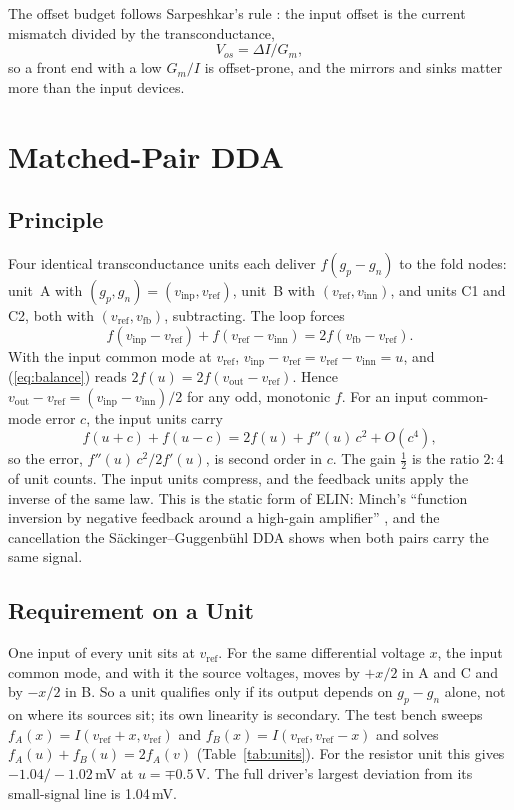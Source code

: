 \documentclass[journal]{IEEEtran}
\newcommand{\mV}{\,mV}
\newcommand{\vinp}{v_\mathrm{inp}}
\newcommand{\vinn}{v_\mathrm{inn}}
\newcommand{\vref}{v_\mathrm{ref}}
\newcommand{\vfb}{v_\mathrm{fb}}
\newcommand{\vout}{v_\mathrm{out}}
\begin{document}
The offset budget follows Sarpeshkar's rule \cite[\S3.3.4]{sarpeshkar97}: the input offset
is the current mismatch divided by the transconductance,
\begin{equation}
V_{os} = \Delta I / G_m ,
\end{equation}
so a front end with a low $G_m/I$ is offset-prone, and the mirrors and sinks matter more than
the input devices.

\section{Matched-Pair DDA}

\subsection{Principle}
Four identical transconductance units each deliver $f(g_p-g_n)$ to the fold nodes:
unit~A with $(g_p,g_n)=(\vinp,\vref)$, unit~B with $(\vref,\vinn)$, and units C1 and C2,
both with $(\vref,\vfb)$, subtracting. The loop forces
\begin{equation}
f(\vinp-\vref)+f(\vref-\vinn)=2f(\vfb-\vref).
\label{eq:balance}
\end{equation}
With the input common mode at $\vref$, $\vinp-\vref=\vref-\vinn=u$, and (\ref{eq:balance})
reads $2f(u)=2f(\vout-\vref)$. Hence $\vout-\vref=(\vinp-\vinn)/2$ for any odd, monotonic $f$.
For an input common-mode error $c$, the input units carry
\begin{equation}
f(u+c)+f(u-c)=2f(u)+f''(u)\,c^2+O(c^4),
\end{equation}
so the error, $f''(u)\,c^2/2f'(u)$, is second order in $c$. The gain $\tfrac12$ is the ratio
$2{:}4$ of unit counts. The input units compress, and the feedback units apply the inverse of
the same law. This is the static form of ELIN: Minch's ``function inversion by negative
feedback around a high-gain amplifier'' \cite{minch97}, and the cancellation the
Säckinger--Guggenbühl DDA \cite{sackinger87} shows when both pairs carry the same signal.

\subsection{Requirement on a Unit}
One input of every unit sits at $\vref$. For the same differential voltage $x$, the input
common mode, and with it the source voltages, moves by $+x/2$ in A and C and by $-x/2$ in B.
So a unit qualifies only if its output depends on $g_p-g_n$ alone, not on where its sources
sit; its own linearity is secondary. The test bench sweeps
$f_A(x)=I(\vref+x,\vref)$ and $f_B(x)=I(\vref,\vref-x)$ and solves
$f_A(u)+f_B(u)=2f_A(v)$ (Table~\ref{tab:units}). For the resistor unit this gives
$-1.04/-1.02$\mV{} at $u=\mp0.5$\,V. The full driver's largest deviation from its
small-signal line is 1.04\mV.
\end{document}
